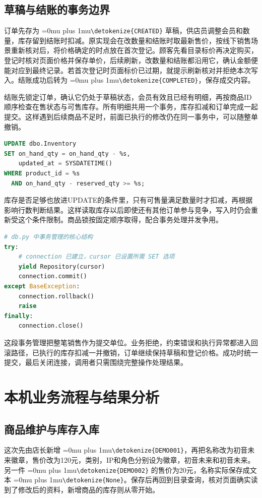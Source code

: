 \documentclass{SYSUReport}
\newcommand{\code}[1]{\begingroup\Urlmuskip=0mu plus 1mu\expandafter\nolinkurl\expandafter{\detokenize{#1}}\endgroup}
\begin{document}
\medskip
\Needspace{0.82\textheight}
\subsection{草稿与结账的事务边界}
订单先存为 \code{CREATED} 草稿，供店员调整会员和数量，库存留到结账时扣减。原实现会在改数量和结账时取最新售价，按线下销售场景重新核对后，将价格确定的时点放在首次登记。顾客先看目录标价再决定购买，登记时核对页面价格并保存单价，后续刷新，改数量和结账都沿用它，确认金额便能对应到最终记录。若首次登记时页面标价已过期，就提示刷新核对并拒绝本次写入。结账成功后转为 \code{COMPLETED}，保存成交内容。

结账先锁定订单，确认它仍处于草稿状态，会员有效且已经有明细，再按商品ID顺序检查在售状态与可售库存。所有明细共用一个事务，库存扣减和订单完成一起提交。这样遇到后续商品不足时，前面已执行的修改仍在同一事务中，可以随整单撤销。

\begin{lstlisting}[language=SQL]
UPDATE dbo.Inventory
SET on_hand_qty = on_hand_qty - %s,
    updated_at = SYSDATETIME()
WHERE product_id = %s
  AND on_hand_qty - reserved_qty >= %s;
\end{lstlisting}

库存是否足够也放进UPDATE的条件里，只有可售量满足数量时才扣减，再根据影响行数判断结果。这样读取库存以后即使还有其他订单参与竞争，写入时仍会重新受这个条件限制。商品锁按固定顺序取得，配合事务处理并发争用。

\begin{lstlisting}[language=Python]
# db.py 中事务管理的核心结构
try:
    # connection 已建立，cursor 已设置所需 SET 选项
    yield Repository(cursor)
    connection.commit()
except BaseException:
    connection.rollback()
    raise
finally:
    connection.close()
\end{lstlisting}

这段事务管理把整笔销售作为提交单位。业务拒绝，约束错误和执行异常都进入回滚路径，已执行的库存扣减一并撤销，订单继续保持草稿和登记价格。成功时统一提交，最后关闭连接，调用者只需围绕完整操作处理结果。

\clearpage
\section{本机业务流程与结果分析}
\subsection{商品维护与库存入库}
这次先由店长新增 \code{DEMO001}，再把名称改为初音未来徽章，售价改为120元，类别，IP和角色分别设为徽章，初音未来和初音未来。另一件 \code{DEMO002} 的售价为20元，名称实际保存成文本 \code{None}。保存后再回到目录查询，核对页面确实读到了修改后的资料，新增商品的库存则从零开始。
\end{document}
